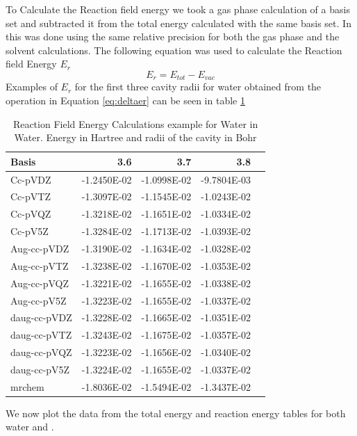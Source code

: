 \documentclass[../master_thesis.tex]{subfiles}
\begin{document}
To Calculate the Reaction field energy we took a gas phase calculation
of a basis set and subtracted it from the total energy calculated with the same
basis set. In \mrchem this was done using the same relative precision for both
the gas phase and the solvent calculations. The following equation was used to
calculate the Reaction field Energy $E_r$
\begin{equation}\label{eq:deltaer}
  E_r = E_{tot} - E_{vac}
\end{equation}
Examples of $E_r$ for the first three cavity radii for water obtained from the operation
in Equation \ref{eq:deltaer} can be seen in table \ref{tab:Erwatdata}

\begin{table}[!htbp]
\caption{Reaction Field Energy Calculations example for Water in Water. Energy in Hartree and radii of the cavity in Bohr}
\begin{center}
\begin{tabular}{l|r|r|r|r}
Basis & 3.6 & 3.7 & 3.8 \\\hline
Cc-pVDZ & -1.2450E-02 & -1.0998E-02 & -9.7804E-03 \\
Cc-pVTZ & -1.3097E-02 & -1.1545E-02 & -1.0243E-02 \\
Cc-pVQZ & -1.3218E-02 & -1.1651E-02 & -1.0334E-02 \\
Cc-pV5Z & -1.3284E-02 & -1.1713E-02 & -1.0393E-02 \\
Aug-cc-pVDZ & -1.3190E-02 & -1.1634E-02 & -1.0328E-02 \\
Aug-cc-pVTZ & -1.3238E-02 & -1.1670E-02 & -1.0353E-02 \\
Aug-cc-pVQZ & -1.3221E-02 & -1.1655E-02 & -1.0338E-02 \\
Aug-cc-pV5Z & -1.3223E-02 & -1.1655E-02 & -1.0337E-02 \\
daug-cc-pVDZ & -1.3228E-02 & -1.1665E-02 & -1.0351E-02 \\
daug-cc-pVTZ & -1.3243E-02 & -1.1675E-02 & -1.0357E-02 \\
daug-cc-pVQZ & -1.3223E-02 & -1.1656E-02 & -1.0340E-02 \\
daug-cc-pV5Z & -1.3224E-02 & -1.1655E-02 & -1.0337E-02 \\
mrchem & -1.8036E-02 & -1.5494E-02 & -1.3437E-02 \\
\end{tabular}
\end{center}
\label{tab:Erwatdata}
\end{table}


We now plot the data from the total energy and reaction energy tables for
both water and .
\end{document}

